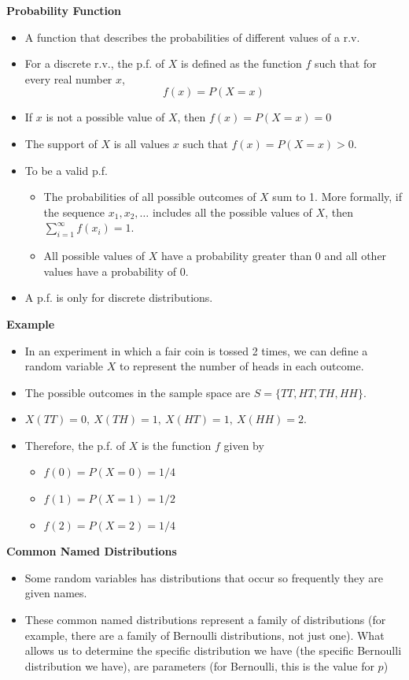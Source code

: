 \documentclass[11pt]{article}
\begin{document}
\textbf{Probability Function}
\begin{itemize}
    \item A function that describes the probabilities of different values of a r.v.
    \item For a discrete r.v., the p.f. of $X$ is defined as the function $f$ such that for 
    every real number $x$, \[f(x)=P(X=x)\]
    \item If $x$ is not a possible value of $X$, then $f(x)=P(X=x)=0$
    \item The support of $X$ is all values $x$ such that $f(x)=P(X=x)>0$.
    \item To be a valid p.f.
    \begin{itemize}
        \item The probabilities of all possible outcomes of $X$ sum to 1. More formally, if the
        sequence $x_1, x_2, \ldots$ includes all the possible values of $X$, then $\sum_{i=1}^
        {\infty} f(x_i) = 1$.
        \item All possible values of $X$ have a probability greater than 0 and all other values 
        have a probability of 0.
    \end{itemize}
    \item A p.f. is only for discrete distributions.
\end{itemize}

\textbf{Example}
    \begin{itemize}
        \item In an experiment in which a fair coin is tossed 2 times, we can define a random 
        variable $X$ to represent the number of heads in each outcome.
        \item The possible outcomes in the sample space are $S = \{TT, HT, TH, HH\}$.
        \item $X(TT)=0,\ X(TH)=1,\  X(HT)=1,\ X(HH)=2$.
        \item Therefore, the p.f. of $X$ is the function $f$ given by 
        \begin{itemize}
            \item $f(0) = P(X=0) = 1/4 $
            \item $f(1) = P(X=1) = 1/2 $
            \item $f(2) = P(X=2) = 1/4 $
        \end{itemize}
    \end{itemize} 

\textbf{Common Named Distributions}
\begin{itemize}
    \item Some random variables has distributions that occur so frequently they are given 
    names. 
    \item These common named distributions represent a family of distributions (for example, 
    there are a family of Bernoulli distributions, not just one). What allows us to determine 
    the specific distribution we have (the specific Bernoulli distribution we have), are 
    parameters (for Bernoulli, this is the value for $p$)
\end{itemize}
\end{document}

